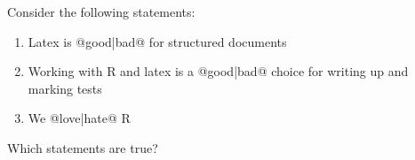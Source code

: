 \documentclass[10pt]{examdesign}
\begin{document}
\begin{multiplechoice}[resetcounter=no,  examcolumns=1]
\begin{question}


\end{question}


\begin{question}

	Consider the following statements:

	\begin{enumerate}[I]
		\item Latex is @{good}|{bad}@ for structured documents

		\item Working with R and latex is a @{good}|{bad}@ choice for writing up and marking tests

		\item We @{love}|{hate}@ R

	\end{enumerate}

	Which statements are true?


\end{question}


\end{multiplechoice}
\end{document}
